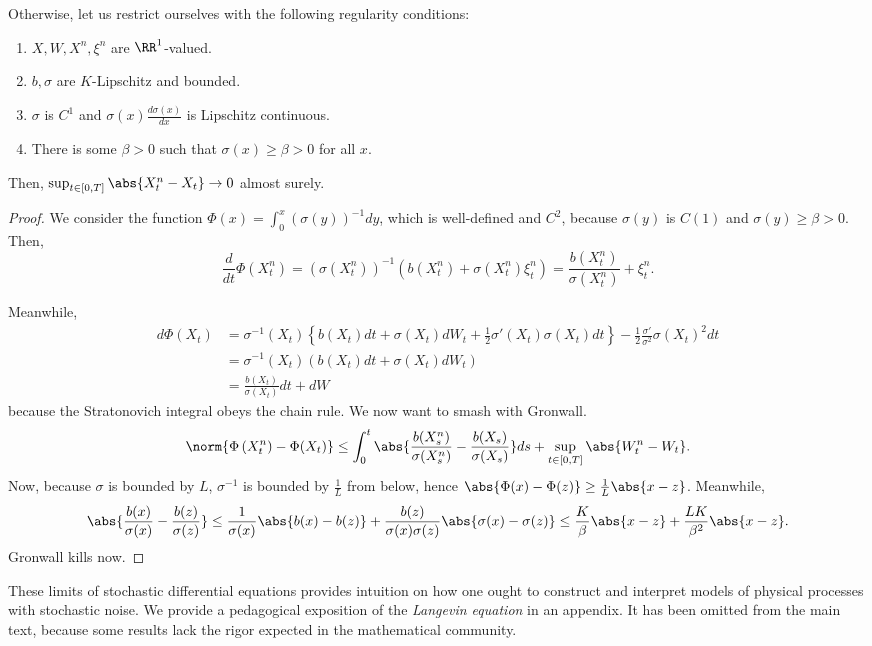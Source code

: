 \documentclass{scrartcl}
\begin{document}
\begin{thm}
    Otherwise, let us restrict ourselves with the following regularity conditions:
    \begin{enumerate}
        \item $X,W, X^n, \xi^n$ are $\RR^1$-valued.
        \item $b,\sigma$ are $K$-Lipschitz and bounded.
        \item $\sigma$ is $C^1$ and $\sigma(x) \frac{d\sigma(x)}{dx}$ is Lipschitz continuous.
        \item There is some $\beta > 0$ such that $\sigma(x)\geq\beta > 0$ for all $x$.
    \end{enumerate}
    Then, $\sup_{t\in [0,T]} \abs{X^n_t - X_t}\to 0$ almost surely.
\end{thm}

\begin{proof}
We consider the function $\Phi(x) = \int_0^x \left(\sigma(y)\right)^{-1} dy$, which is well-defined and $C^2$, because $\sigma(y)$ is $C(1)$ and $\sigma(y) \geq \beta > 0$. Then,
$$
\frac{d}{dt} \Phi\left(X^n_t\right) = \left(\sigma(X^n_t)\right)^{-1} \left(b(X^n_t) + \sigma(X^n_t)\xi^n_t\right) = \frac{b(X^n_t)}{\sigma(X^n_t)}+\xi^n_t.
$$

Meanwhile,
\begin{align*}
d\Phi(X_t)&=\sigma^{-1}(X_t)\left\{b(X_t)dt + \sigma(X_t)dW_t + \frac12\sigma'(X_t)\sigma(X_t)dt\right\} -\frac12\frac{\sigma'}{\sigma^2}\sigma(X_t)^2dt\\
&= \sigma^{-1}\left(X_t\right)\left(b\left(X_t\right)dt + \sigma(X_t)dW_t\right)\\
&= \frac{b(X_t)}{\sigma(X_t)}dt + dW
\end{align*}
because the Stratonovich integral obeys the chain rule. We now want to smash with Gronwall.
\[
\norm{\Phi\left(X^n_t\right) - \Phi(X_t)} \leq \int_0^t \abs{\frac{b(X^n_s)}{\sigma(X^n_s)} - \frac{b(X_s)}{\sigma(X_s)}}ds + \sup_{t\in [0,T]} \abs{W^n_t - W_t}.
\]
Now, because $\sigma$ is bounded by $L$, $\sigma^{-1}$ is bounded by $\frac1L$ from below, hence $\abs{\Phi(x) - \Phi(z)}\geq \frac1L\abs{x-z}$. Meanwhile,$$\abs{\frac{b(x)}{\sigma(x)} - \frac{b(z)}{\sigma(z)}} \leq \frac{1}{\sigma(x)}\abs{b(x) - b(z)} + \frac{b(z)}{\sigma(x)\sigma(z)} \abs{\sigma(x) - \sigma(z)}\leq \frac{K}{\beta}\abs{x - z} + \frac{LK}{\beta^2}\abs{x-z}.$$Gronwall kills now.
\end{proof}

These limits of stochastic differential equations provides intuition on how one ought to construct and interpret models of physical processes with stochastic noise. We provide a pedagogical exposition of the \emph{Langevin equation} in an appendix. It has been omitted from the main text, because some results lack the rigor expected in the mathematical community.
\end{document}
